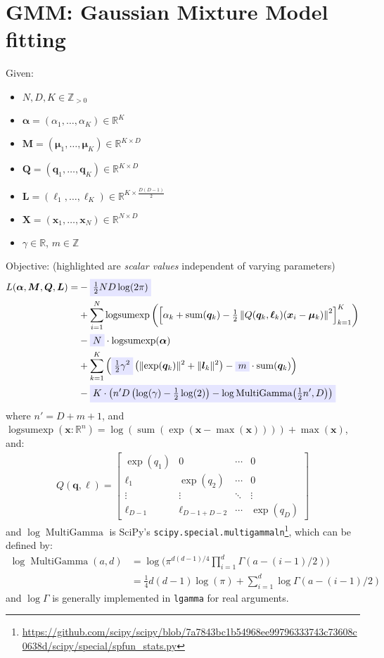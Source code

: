 \documentclass[11pt]{article}
\newcommand\R{\mathbb R}
\newcommand\Z{\mathbb Z}
\newcommand\logsumexp{\operatorname*{logsumexp}}
\newcommand\sumf{\operatorname*{sum}}
\newcommand\MultiGamma{\operatorname*{MultiGamma}}
\newcommand\precomptext[1]{\colorbox[rgb]{0.9,0.9,1}{#1}}
\newcommand\precomp[1]{\precomptext{$\displaystyle#1$}}
\begin{document}
\section{GMM: Gaussian Mixture Model fitting}

Given:
\begin{itemize}
\item $N, D, K \in \Z_{>0}$
\item $\bm{\alpha} = (\alpha_1,\ldots,\alpha_K) \in \R^K$
\item $\bm{M} = (\bm{\mu}_1,\ldots,\bm{\mu}_K) \in \R^{K \times D}$
\item $\bm{Q} = (\bm{q}_1,\ldots,\bm{q}_K) \in \R^{K \times D}$
\item $\bm{L} = (\bm{\ell}_1,\ldots,\bm{\ell}_K) \in \R^{K \times \frac{D(D-1)}{2}}$
\item $\bm{X} = (\bm{x}_1,\ldots,\bm{x}_N) \in \R^{N \times D}$
\item $\gamma \in \R$, $m \in \Z$
\end{itemize}

Objective: (\precomptext{highlighted} are \emph{scalar values} independent of varying parameters)
\begin{align*}
L(\bm{\alpha}, \bm{M}, \bm{Q}, \bm{L}) =
	&-\precomp{\tfrac12 N D \log(2\pi)} \\
	&+ \sum_{i=1}^N \logsumexp\left( \left[
		\alpha_k
		+ \sumf(\bm{q}_k)
		- \tfrac12\left\lVert
			Q(\bm{q}_k, \bm{\ell}_k) (\bm{x}_i - \bm{\mu}_k)
		\right\rVert^2
	\right]_{k=1}^K \right) \\
	&- \precomp{N} \cdot \logsumexp(\bm{\alpha}) \\
	&+ \sum_{k=1}^K \left(
		\precomp{\tfrac12 \gamma^2} \left(\lVert \exp(\bm{q}_k) \rVert^2 + \lVert \bm{l}_k \rVert^2\right)
		- \precomp{m} \cdot \sumf(\bm{q}_k)
	\right) \\
	&- \precomp{K \cdot \left( n' D \left(\log(\gamma) - \tfrac12\log(2)\right) - \log\MultiGamma\bigl(\tfrac12 n', D\bigr) \right)}
\end{align*}
where $n' = D + m + 1$, and $\logsumexp(\bm{x} : \R^n) = \log(\sumf(\exp(\bm{x} - \max(\bm{x})))) + \max(\bm{x})$, and:
\begin{align*}
Q(\bm{q}, \bm{\ell}) = \begin{bmatrix}
	\exp(q_1) & 0 & \cdots & 0 \\
	\ell_1 & \exp(q_2) & \cdots & 0 \\
	\vdots & \vdots & \ddots & \vdots \\
	\ell_{D-1} & \ell_{D-1+D-2} & \cdots & \exp(q_D)
\end{bmatrix}
\end{align*}
and $\log\MultiGamma$ is SciPy's \texttt{scipy.special.multigammaln}\footnote{\url{https://github.com/scipy/scipy/blob/7a7843bc1b54968ee99796333743c73608c0638d/scipy/special/spfun_stats.py}}, which can be defined by:
\begin{align*}
\log\MultiGamma(a, d)
&= \log \biggl( \pi^{d(d-1)/4} \prod_{i=1}^d \Gamma(a - (i-1)/2) \biggr) \\
&= \tfrac14 d(d-1) \log(\pi) + \sum_{i=1}^d \log\Gamma(a - (i-1)/2)
\end{align*}
and $\log\Gamma$ is generally implemented in \texttt{lgamma} for real arguments.
\end{document}
